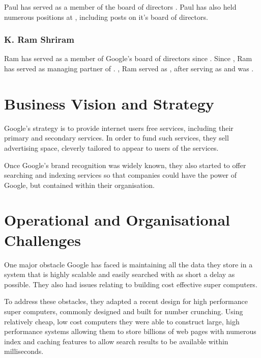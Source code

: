 \documentclass[a4paper,12pt]{article}
\begin{document}
Paul has served as a member of the board of directors 
\cite[April 2004]{board}. Paul has also held numerous positions at
\cite[Intel]{board}, including posts on it's board of directors. 
\cite[Paul holds a Master's degree from the University of California 
at Berkeley and a Bachelors degree in economics from the University 
of San Francisco.]{board}

\subsubsection{K. Ram Shriram}

Ram has served as a member of Google's board of directors since
\cite[September 1998]{board}. Since \cite[January 2000]{board}, 
Ram has served as managing partner of 
\cite[Sherpalo]{board}. \cite[From August 1998 to September 1999]{board},
Ram served as 
\cite[Vice President of Business Development at Amazon.com]{board},
after serving as \cite[President at Junglee]{board} and was 
\cite[an early member of the Netscape executive team]{board}. 
\cite[Ram holds a Bachelor of Science degree from the University of
Madras, India.]{board}

\section{Business Vision and Strategy}

Google's strategy is to provide internet users free services, including
their primary and secondary services. In order to fund such services,
they sell advertising space, cleverly tailored to appear to users of the
services.


Once Google's brand recognition was widely known, they also started to
offer searching and indexing services so that companies could have the
power of Google, but contained within their organisation. 

\section{Operational and Organisational Challenges}

One major obstacle Google has faced is maintaining all the data they
store in a system that is highly scalable and easily searched with as
short a delay as possible. They also had issues relating to building
cost effective super computers.


To address these obstacles, they adapted a recent design for high
performance super computers, commonly designed and built for number
crunching. Using relatively cheap, low cost computers they were able to
construct large, high performance systems allowing them to store
billions of web pages with numerous index and caching features to allow
search results to be available within milliseconds.
\end{document}
